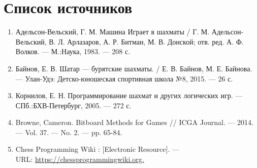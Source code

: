 {
	\chapter*{Список источников}
	\begin{enumerate}
		\item Адельсон-Вельский, Г. М. Машина Играет в шахматы / Г. М. Адельсон-Вельский, В. Л. Арлазаров, А. Р. Битман, М. В. Донской; отв. ред. А. Ф. Волков. --- М.:Наука, 1983. --- 208 с.
		\item Байнов, Е. В. Шатар --- бурятские шахматы. / Е. В. Байнов, М. Е. Байнова. --- Улан-Удэ: Детско-юношеская спортивная школа №8, 2015. --- 26 с.
		\item Корнилов, Е. Н. Программирование шахмат и других логических игр. --- СПб.:БХВ-Петербург, 2005. --- 272 с. 
		\item Browne, Cameron. Bitboard Methods for Games // ICGA Journal. --- 2014. --- Vol. 37. --- No. 2. --- pp. 65-84.
		\item Chess Programming Wiki : [Electronic Resource]. --- \\URL: \href{https://chessprogrammingwiki.org}{https://chessprogrammingwiki.org.}
	\end{enumerate}
	\clearpage
}